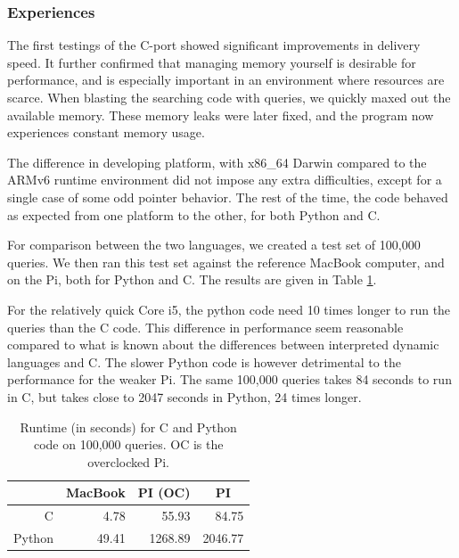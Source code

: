 \subsubsection{Experiences}
The first testings of the C-port showed significant improvements in delivery speed.
It further confirmed that managing memory yourself is desirable for performance, and is especially important in an environment where resources are scarce.
When blasting the searching code with queries, we quickly maxed out the available memory.
These memory leaks were later fixed, and the program now experiences constant memory usage.

The difference in developing platform, with x86\_64 Darwin compared to the ARMv6 runtime environment did not impose any extra difficulties, except for a single case of some odd pointer behavior.
The rest of the time, the code behaved as expected from one platform to the other, for both Python and C.

For comparison between the two languages, we created a test set of 100,000 queries. We then ran this test set against the reference MacBook computer, and on the Pi, both for Python and {C}.
The results are given in Table \ref{tbl:runtimes_ports}.

For the relatively quick {Core i5}, the python code need 10 times longer to run the queries than the C code. This difference in performance seem reasonable compared to what is known about the differences between interpreted dynamic languages and C.
The slower Python code is however detrimental to the performance for the weaker Pi. The same 100,000 queries takes 84 seconds to run in C, but takes close to 2047 seconds in Python, 24 times longer.

\begin{table}[h]
	\begin{center}
	\begin{tabular}{|r|r|r|r|}
	\hline
	   & \multicolumn{1}{|c|}{MacBook} & \multicolumn{1}{|c|}{PI (OC)}  & \multicolumn{1}{|c|}{PI} \\
	\hline
	C      & 4.78 & 55.93 & 84.75     \\
	\hline
	Python & 49.41 & 1268.89 & 2046.77   \\

	\hline
	\end{tabular}
	\caption{Runtime (in seconds) for C and Python code on 100,000 queries. OC is the overclocked Pi.}
	\label{tbl:runtimes_ports}
	\end{center}
\end{table}

